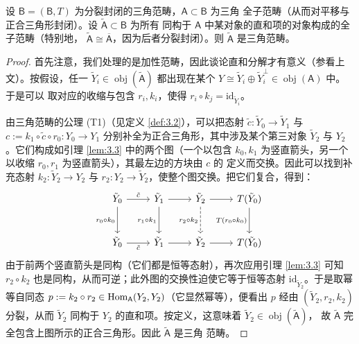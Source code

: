 \begin{Lem}\label{lem:4.4}
设 $\mathsf B=(\mathsf B,T)$ 为分裂封闭的三角范畴，$\mathsf A\subset\mathsf B$ 为三角
全子范畴（从而对平移与正合三角形封闭）。设 $\tilde{\mathsf A}\subset\mathsf B$ 为所有
同构于 $\mathsf A$ 中某对象的直和项的对象构成的全子范畴（特别地，
$\tilde{\mathsf A}\cong\overline{\mathsf A}$，因为后者分裂封闭）。则 $\tilde{\mathsf A}$
是三角范畴。
\end{Lem}

\begin{proof}
首先注意，我们处理的是加性范畴，因此谈论直和分解才有意义（参看上文）。按假设，任一
$\tilde Y_i\in\operatorname{obj}(\tilde{\mathsf A})$ 都出现在某个
$Y\cong\tilde Y_i\oplus\tilde Y_i^{\perp}\in\operatorname{obj}(\mathsf A)$ 中。于是可以
取对应的收缩与包含 $r_i,k_i$，使得 $r_i\circ k_j=\mathrm{id}_{\tilde Y_i}$。

由三角范畴的公理 (T1)（见定义 \ref{def:3.2}），可以把态射
$\tilde c:\tilde Y_0\to\tilde Y_1$ 与
$c:=k_1\circ\tilde c\circ r_0:Y_0\to Y_1$ 分别补全为正合三角形，其中涉及某个第三对象
$\tilde Y_2$ 与 $Y_2$。它们构成如引理 \ref{lem:3.3} 中的两个图（一个以包含
$k_0,k_1$ 为竖直箭头，另一个以收缩 $r_0,r_1$ 为竖直箭头），其最左边的方块由 $c$ 的
定义而交换。因此可以找到补充态射 $k_2:\tilde Y_2\to Y_2$ 与
$r_2:Y_2\to\tilde Y_2$，使整个图交换。把它们复合，得到：
\[
  \begin{tikzcd}[row sep=large]
    \tilde Y_0 \arrow[r, "\tilde c"] \arrow[d, "r_0\circ k_0"']
      & \tilde Y_1 \arrow[r] \arrow[d, "r_1\circ k_1"']
      & \tilde Y_2 \arrow[r] \arrow[d, dashed, "r_2\circ k_2"']
      & T(\tilde Y_0) \arrow[d, "T(r_0\circ k_0)"'] \\
    \tilde Y_0 \arrow[r, "\tilde c"']
      & \tilde Y_1 \arrow[r]
      & \tilde Y_2 \arrow[r]
      & T(\tilde Y_0)
  \end{tikzcd}
\]
由于前两个竖直箭头是同构（它们都是恒等态射），再次应用引理 \ref{lem:3.3} 可知
$r_2\circ k_2$ 也是同构，从而可逆；此外图的交换性迫使它等于恒等态射
$\mathrm{id}_{\tilde Y_2}$。于是取幂等自同态 $p:=k_2\circ r_2\in\operatorname{Hom}_{\mathsf A}(Y_2,Y_2)$（它显然幂等），便看出
$p$ 经由 $(\tilde Y_2,r_2,k_2)$ 分裂，从而 $\tilde Y_2$
同构于 $Y_2$ 的直和项。按定义，这意味着 $\tilde Y_2\in\operatorname{obj}(\tilde{\mathsf A})$，
故 $\tilde{\mathsf A}$ 完全包含上图所示的正合三角形。因此 $\tilde{\mathsf A}$ 是三角
范畴。
\end{proof}

